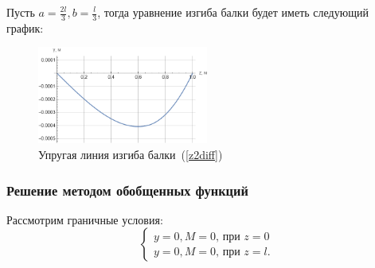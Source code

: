 \documentclass[12pt, a4paper]{article}
\begin{document}
Пусть $a = \frac{2 l}{3}, b = \frac{l}{3}$, тогда уравнение изгиба балки будет иметь следующий график:
\begin{figure}[!h]
	\centering
	\includegraphics[width=0.5\textwidth]{g.2}%
	\caption{Упругая линия изгиба балки~(\ref{z2diff})}
	\vspace*{-2mm}
	\label{g2}
\end{figure}

\subsubsection{Решение методом обобщенных функций}
Рассмотрим граничные условия:
\begin{equation}
	\label{diffbse12c}
	\begin{cases}
		y = 0, M = 0 \mbox{, при } z = 0\\
		y = 0, M = 0 \mbox{, при } z = l.
	\end{cases}
\end{equation}
\end{document}
